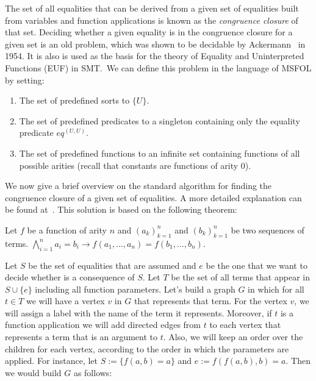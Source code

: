 The set of all equalities that can be derived from a given set of equalities built from variables and function applications is known as the \textit{congruence closure} of that set. Deciding whether a given equality is in the congruence closure for a given set is an old problem, which was shown to be decidable by Ackermann~\cite{ack_cong} in 1954. It is also is used as the basis for the theory of Equality and Uninterpreted Functions (EUF) in SMT.~We can define this problem in the language of MSFOL by setting:
\begin{enumerate}
  \item The set of predefined sorts to $\{U\}$.
  \item The set of predefined predicates to a singleton containing only the equality predicate $eq^{(U, U)}$.
  \item The set of predefined functions to an infinite set containing functions of all possible arities (recall that constants are functions of arity $0$). 
\end{enumerate}

We now give a brief overview on the standard algorithm for finding the congruence closure of a given set of equalities. A more detailed explanation can be found at~\cite{orig_cong_clos}. This solution is based on the following theorem:

\begin{theorem}[Congruence]
Let $f$ be a function of arity $n$ and ${(a_{k})}_{k = 1}^{n}$ and ${(b_{k})}_{k = 1}^{n}$ be two sequences of terms. $\bigwedge_{i = 1}^{n} a_{i} = b_{i} \rightarrow f(a_{1}, \ldots, a_{n}) = f(b_{1}, \ldots, b_{n})$.
\end{theorem}

Let $S$ be the set of equalities that are assumed and $e$ be the one that we want to decide whether is a consequence of $S$. Let $T$ be the set of all terms that appear in $S \cup \{e\}$ including all function parameters. Let's build a graph $G$ in which for all $t \in T$ we will have a vertex $v$ in $G$ that represents that term. For the vertex $v$, we will assign a label with the name of the term it represents. Moreover, if $t$ is a function application we will add directed edges from $t$ to each vertex that represents a term that is an argument to $t$. Also, we will keep an order over the children for each vertex, according to the order in which the parameters are applied. For instance, let $S := \{f(a, b) = a\}$ and $e := f(f(a, b), b) = a$. Then we would build $G$ as follows:

